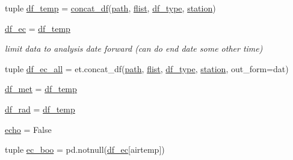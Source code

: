 \begin{DoxyCompactItemize}
\item 
tuple \hyperlink{namespace_date___ranges___concat__mod_a04bb47c20aa18f8069297fa57a209bf7}{df\+\_\+temp} = \hyperlink{namespace_date___ranges___concat__mod_abd1c96c609eee19a81e2c8b933d9a03a}{concat\+\_\+df}(\hyperlink{namespace_date___ranges___concat__mod_a22267529906f1108c44c7fe2c252d206}{path}, \hyperlink{namespace_date___ranges___concat__mod_af5136898921d16fda0cf4e1f27148e0a}{flist}, \hyperlink{namespace_date___ranges___concat__mod_a9af9fbcb29f8cbf5b5bec5151e049dec}{df\+\_\+type}, \hyperlink{namespace_date___ranges___concat__mod_a042a8bd1d8e0f1a68b7ccb4c9d3b6f09}{station})
\item 
\hyperlink{namespace_date___ranges___concat__mod_acfb2ddd0f9bcfb466d62ce1281fb904c}{df\+\_\+ec} = \hyperlink{namespace_date___ranges___concat__mod_a04bb47c20aa18f8069297fa57a209bf7}{df\+\_\+temp}
\begin{DoxyCompactList}\small\item\em limit data to analysis date forward (can do end date some other time) \end{DoxyCompactList}\item 
tuple \hyperlink{namespace_date___ranges___concat__mod_a7c91d56e0b9e1c43d259ab47198f0e34}{df\+\_\+ec\+\_\+all} = et.\+concat\+\_\+df(\hyperlink{namespace_date___ranges___concat__mod_a22267529906f1108c44c7fe2c252d206}{path}, \hyperlink{namespace_date___ranges___concat__mod_af5136898921d16fda0cf4e1f27148e0a}{flist}, \hyperlink{namespace_date___ranges___concat__mod_a9af9fbcb29f8cbf5b5bec5151e049dec}{df\+\_\+type}, \hyperlink{namespace_date___ranges___concat__mod_a042a8bd1d8e0f1a68b7ccb4c9d3b6f09}{station}, out\+\_\+form=\textquotesingle{}dat\textquotesingle{})
\item 
\hyperlink{namespace_date___ranges___concat__mod_a64af05128b2ac7948abb0095738ff6d3}{df\+\_\+met} = \hyperlink{namespace_date___ranges___concat__mod_a04bb47c20aa18f8069297fa57a209bf7}{df\+\_\+temp}
\item 
\hyperlink{namespace_date___ranges___concat__mod_a6d12de17d0b5d91bd919ac922e2929bd}{df\+\_\+rad} = \hyperlink{namespace_date___ranges___concat__mod_a04bb47c20aa18f8069297fa57a209bf7}{df\+\_\+temp}
\item 
\hyperlink{namespace_date___ranges___concat__mod_ac457be966cc9724d04bdf39556d0cb28}{echo} = False
\item 
tuple \hyperlink{namespace_date___ranges___concat__mod_ae828195b9eb1dc7afb1c10e2edfc5d2f}{ec\+\_\+boo} = pd.\+notnull(\hyperlink{namespace_date___ranges___concat__mod_acfb2ddd0f9bcfb466d62ce1281fb904c}{df\+\_\+ec}\mbox{[}\textquotesingle{}airtemp\textquotesingle{}\mbox{]})

\end{DoxyCompactItemize}
